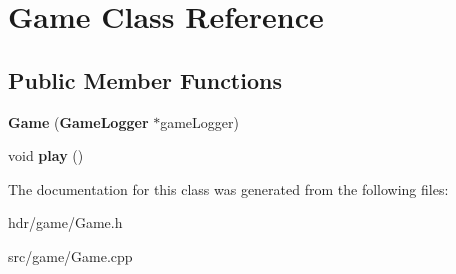 \section{Game Class Reference}
\label{class_game}
\subsection*{Public Member Functions}
\begin{DoxyCompactItemize}
\item 
{\bfseries Game} ({\bf Game\-Logger} $\ast$game\-Logger)\label{class_game_a9f03a276b1af77e70e794ac22ded922e}

\item 
void {\bfseries play} ()\label{class_game_aa333825d0bca80e91e53c7e23f053405}

\end{DoxyCompactItemize}


The documentation for this class was generated from the following files\-:\begin{DoxyCompactItemize}
\item 
hdr/game/Game.\-h\item 
src/game/Game.\-cpp\end{DoxyCompactItemize}
